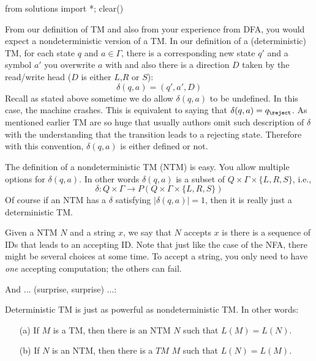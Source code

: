 \begin{python0}
from solutions import *; clear()
\end{python0}

From our definition of TM and also from your experience from DFA,
you would expect a nondeterministic version of a TM. In our
definition of a (deterministic) TM, for each state $q$ and $a \in
\Gamma$, there is a corresponding new state $q'$ and a symbol $a'$
you overwrite $a$ with and also there is a direction $D$ taken by
the read/write head ($D$ is either $L$,$R$ or $S$):
\[
 \delta(q,a) = (q',a',D)
\]
Recall as stated above sometime we do allow $\delta(q,a)$ to be
undefined. In this case, the machine crashes. This is equivalent
to saying that $\delta(q,a) = q_{\reject}$. As mentioned earlier TM
are so huge that usually authors omit such description of $\delta$
with the understanding that the transition leads to a rejecting
state. Therefore with this convention, $\delta(q,a)$ is either
defined or not.

The definition of a nondeterministic TM (NTM) is easy. You allow
multiple options for $\delta(q,a)$. In other words $\delta(q,a)$
is a subset of $Q \times \Gamma \times \{L,R,S\}$, i.e.,
\[
\delta: Q \times \Gamma
\rightarrow
P(Q \times \Gamma \times \{L, R, S\})
\]
Of course if an
NTM has a $\delta$ satisfying $|\delta(q,a)| = 1$, then it is
really just a deterministic TM.

Given a NTM $N$ and a string $x$, we say that $N$ accepts $x$ is
there is a sequence of IDs that leads to an accepting ID. Note
that just like the case of the NFA, there might be several choices
at some time. To accept a string, you only need to have
\textit{one}
accepting computation; the others can fail.

And $\ldots$ (surprise, surprise) $\ldots$:

\begin{thm} Deterministic TM is just as powerful as
nondeterministic TM. In other words:
\begin{itemize}
\item[(a)] If $M$ is a TM, then there is an NTM $N$ such that
$L(M) =
 L(N)$.
\item[(b)] If $N$ is an NTM, then there is a $TM$ $M$ such that
$L(N) = L(M)$.
\end{itemize}
\end{thm}

